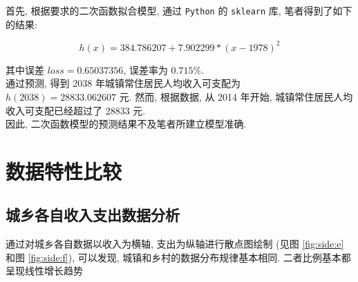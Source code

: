 \documentclass{article}
\begin{document}
首先, 根据要求的二次函数拟合模型, 通过 \texttt{Python} 的 \texttt{sklearn} 库, 笔者得到了如下的结果:

$$
  h\left(x\right) = 384.786207 + 7.902299 * \left(x-1978\right)^2
$$

\indent 其中误差 $loss = 0.65037356$, 误差率为 $0.715\%$.\\
\indent 通过预测, 得到 2038 年城镇常住居民人均收入可支配为 $h\left(2038\right) = 28833.062607$ 元. 然而, 根据数据, 从 2014 年开始, 城镇常住居民人均收入可支配已经超过了 28833 元.\\

因此, 二次函数模型的预测结果不及笔者所建立模型准确.\\

\section{数据特性比较}\label{sec:compare}

\subsection{城乡各自收入支出数据分析}

通过对城乡各自数据以收入为横轴, 支出为纵轴进行散点图绘制 (见图 \ref{fig:side:e} 和图 \ref{fig:side:f}), 可以发现, 城镇和乡村的数据分布规律基本相同. 二者比例基本都呈现线性增长趋势\\
\end{document}
